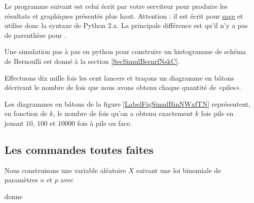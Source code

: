 Le programme suivant est celui écrit par votre serviteur pour produire les résultats et graphiques présentés plus haut. Attention : il est écrit pour \href{http://sagemath.org}{sage} et utilise donc la syntaxe de Python 2.x. La principale différence est qu'il n'y a pas de parenthèse pour .


Une simulation pas à pas en python pour construire un histogramme de schéma de Bernoulli est donné à la section \ref{SecSimulBernrfNskC}.

\begin{example}

Effectuons dix mille fois les cent lancers et traçons un diagramme en bâtons décrivant le nombre de fois que nous avons obtenu chaque quantité de «piles».

Les diagrammes en bâtons de la figure \ref{LabelFigSimulBinNWxfTN} %
représentent, en fonction de \( k\), le nombre de fois qu'on a obtenu exactement \( k\) fois pile en jouant \( 10\), \( 100\) et \( 10000\) fois à pile ou face.
\newcommand{\CaptionFigSimulBinNWxfTN}{Jouer à pile ou face un certain nombre de fois, et s'intéresser au nombre de fois que le «pile» sort.}



\end{example}


\subsection{Les commandes toutes faites}

Nous construisons une variable aléatoire \( X\) suivant une loi binomiale de paramètres \( n\) et \( p\) avec


donne


